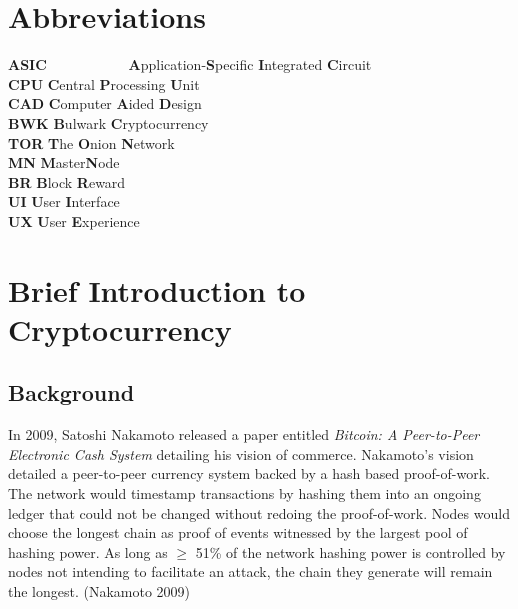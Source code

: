 \documentclass[11pt,a4paperpaper,]{report}
\begin{document}
\newpage


\tableofcontents

\newpage

\chapter*{Abbreviations}\label{abbreviations}

\begin{tabbing}
\textbf{ASIC}~~~~~~~~~~~    \= \textbf{A}pplication-\textbf{S}pecific \textbf{I}ntegrated \textbf{C}ircuit\\
\textbf{CPU}    \> \textbf{C}entral \textbf{P}rocessing \textbf{U}nit \\
\textbf{CAD}    \> \textbf{C}omputer \textbf{A}ided \textbf{D}esign \\
\textbf{BWK}    \> \textbf{B}ulwark \textbf{C}ryptocurrency \\
\textbf{TOR}    \> \textbf{T}he \textbf{O}nion \textbf{N}etwork \\
\textbf{MN} \> \textbf{M}aster\textbf{N}ode \\
\textbf{BR} \> \textbf{B}lock \textbf{R}eward \\
\textbf{UI} \> \textbf{U}ser \textbf{I}nterface \\
\textbf{UX} \> \textbf{U}ser \textbf{E}xperience \\
\end{tabbing}

\newpage

\setcounter{page}{1} \renewcommand{\thepage}{\arabic{page}}

\chapter{Brief Introduction to
Cryptocurrency}\label{brief-introduction-to-cryptocurrency}

\section{Background}\label{background}

In 2009, Satoshi Nakamoto released a paper entitled
\textit{Bitcoin: A Peer-to-Peer Electronic Cash System} detailing his
vision of commerce. Nakamoto's vision detailed a peer-to-peer currency
system backed by a hash based proof-of-work. The network would timestamp
transactions by hashing them into an ongoing ledger that could not be
changed without redoing the proof-of-work. Nodes would choose the
longest chain as proof of events witnessed by the largest pool of
hashing power. As long as \(\geq\) 51\% of the network hashing power is
controlled by nodes not intending to facilitate an attack, the chain
they generate will remain the longest. (Nakamoto 2009)
\end{document}
